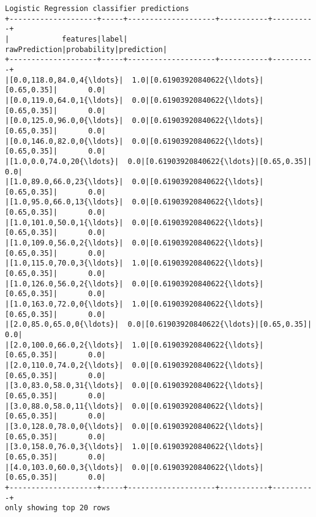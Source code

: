 \documentclass{report}
\begin{document}
    \begin{Verbatim}[commandchars=\\\{\}]
Logistic Regression classifier predictions
+--------------------+-----+--------------------+-----------+----------+
|            features|label|       rawPrediction|probability|prediction|
+--------------------+-----+--------------------+-----------+----------+
|[0.0,118.0,84.0,4{\ldots}|  1.0|[0.61903920840622{\ldots}|[0.65,0.35]|       0.0|
|[0.0,119.0,64.0,1{\ldots}|  0.0|[0.61903920840622{\ldots}|[0.65,0.35]|       0.0|
|[0.0,125.0,96.0,0{\ldots}|  0.0|[0.61903920840622{\ldots}|[0.65,0.35]|       0.0|
|[0.0,146.0,82.0,0{\ldots}|  0.0|[0.61903920840622{\ldots}|[0.65,0.35]|       0.0|
|[1.0,0.0,74.0,20{\ldots}|  0.0|[0.61903920840622{\ldots}|[0.65,0.35]|       0.0|
|[1.0,89.0,66.0,23{\ldots}|  0.0|[0.61903920840622{\ldots}|[0.65,0.35]|       0.0|
|[1.0,95.0,66.0,13{\ldots}|  0.0|[0.61903920840622{\ldots}|[0.65,0.35]|       0.0|
|[1.0,101.0,50.0,1{\ldots}|  0.0|[0.61903920840622{\ldots}|[0.65,0.35]|       0.0|
|[1.0,109.0,56.0,2{\ldots}|  0.0|[0.61903920840622{\ldots}|[0.65,0.35]|       0.0|
|[1.0,115.0,70.0,3{\ldots}|  1.0|[0.61903920840622{\ldots}|[0.65,0.35]|       0.0|
|[1.0,126.0,56.0,2{\ldots}|  0.0|[0.61903920840622{\ldots}|[0.65,0.35]|       0.0|
|[1.0,163.0,72.0,0{\ldots}|  1.0|[0.61903920840622{\ldots}|[0.65,0.35]|       0.0|
|[2.0,85.0,65.0,0{\ldots}|  0.0|[0.61903920840622{\ldots}|[0.65,0.35]|       0.0|
|[2.0,100.0,66.0,2{\ldots}|  1.0|[0.61903920840622{\ldots}|[0.65,0.35]|       0.0|
|[2.0,110.0,74.0,2{\ldots}|  0.0|[0.61903920840622{\ldots}|[0.65,0.35]|       0.0|
|[3.0,83.0,58.0,31{\ldots}|  0.0|[0.61903920840622{\ldots}|[0.65,0.35]|       0.0|
|[3.0,88.0,58.0,11{\ldots}|  0.0|[0.61903920840622{\ldots}|[0.65,0.35]|       0.0|
|[3.0,128.0,78.0,0{\ldots}|  0.0|[0.61903920840622{\ldots}|[0.65,0.35]|       0.0|
|[3.0,158.0,76.0,3{\ldots}|  1.0|[0.61903920840622{\ldots}|[0.65,0.35]|       0.0|
|[4.0,103.0,60.0,3{\ldots}|  0.0|[0.61903920840622{\ldots}|[0.65,0.35]|       0.0|
+--------------------+-----+--------------------+-----------+----------+
only showing top 20 rows


\end{Verbatim}
\end{document}

